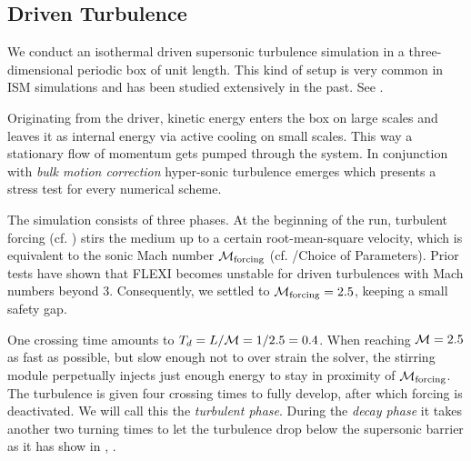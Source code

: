 \subsection{Driven Turbulence}
\label{sec:stirturb}

We conduct an isothermal driven supersonic turbulence simulation in a
three-dimensional periodic box of unit length. This kind of setup is very
common in ISM simulations and has been studied extensively in the past. See
\cite{schmidt2009numerical,kitsionas2009algorithmic,0004-637X-665-1-416,mac1998kinetic}.

Originating from the driver, kinetic energy enters the box on large scales
and leaves it as internal energy via active cooling on small scales. This way a
stationary flow of momentum gets pumped through the system.  In conjunction
with \emph{bulk motion correction} hyper-sonic turbulence emerges which
presents a stress test for every numerical scheme.

The simulation consists of three phases. At the beginning of the run, turbulent
forcing (cf. ) stirs the medium up to a certain
root-mean-square velocity, which is equivalent to the sonic Mach number
$\mathcal{M}_{\text{forcing}}$ (cf. /Choice of Parameters).
Prior tests have shown that FLEXI becomes unstable for driven turbulences with
Mach numbers beyond 3.  Consequently, we settled to $\mathcal{M}_{\text{forcing}} =
2.5$, keeping a small safety gap.

One crossing time amounts to $T_d = L/\mathcal{M} = 1/2.5 = 0.4$.  When reaching
$\mathcal{M} = 2.5$ as fast as possible, but slow enough not to over strain the solver, the
stirring module perpetually injects just enough energy to stay in proximity of
$\mathcal{M}_{\text{forcing}}$. The turbulence is given four crossing times to fully
develop, after which forcing is deactivated.  We will call this the
\emph{turbulent phase}. During the \emph{decay phase} it takes another two
turning times to let the turbulence drop below the supersonic barrier as it
has show in \cite{stone1998dissipation}, \cite{mac1998kinetic}.

